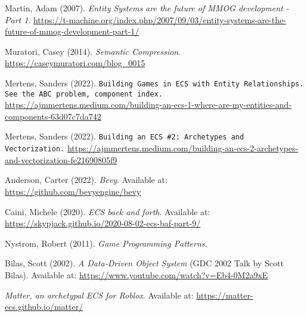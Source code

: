 \documentclass[openany, amssymb, psamsfonts]{amsart}
\theoremstyle{definition}
\numberwithin{equation}{section}
\begin{document}
\sloppy
{}
\begin{thebibliography}{10000}

Martin, Adam (2007). 
\textit{Entity Systems are the future of MMOG development - Part 1}. 
\url{https://t-machine.org/index.php/2007/09/03/entity-systems-are-the-future-of-mmog-development-part-1/}

Muratori, Casey (2014). 
\textit{Semantic Compression}. 
\url{https://caseymuratori.com/blog_0015}

Mertens, Sanders (2022). \texttt{Building Games in ECS with Entity Relationships. See the ABC problem, component index.}
\url{https://ajmmertens.medium.com/building-an-ecs-1-where-are-my-entities-and-components-63d07c7da742}

Mertens, Sanders (2022). \texttt{Building an ECS \#2: Archetypes and Vectorization.}
\url{https://ajmmertens.medium.com/building-an-ecs-2-archetypes-and-vectorization-fe21690805f9}

Anderson, Carter (2022). 
\textit{Bevy}. 
Available at: \url{https://github.com/bevyengine/bevy}

Caini, Michele (2020). 
\textit{ECS back and forth}. 
Available at: \url{https://skypjack.github.io/2020-08-02-ecs-baf-part-9/}

Nystrom, Robert (2011). 
\textit{Game Programming Patterns}.

Bilas, Scott (2002). 
\textit{A Data-Driven Object System} (GDC 2002 Talk by Scott Bilas). 
Available at: \url{https://www.youtube.com/watch?v=Eb4-0M2a9xE}

\textit{Matter, an archetypal ECS for Roblox}. 
Available at: \url{https://matter-ecs.github.io/matter/}


\end{thebibliography}
\end{document}
